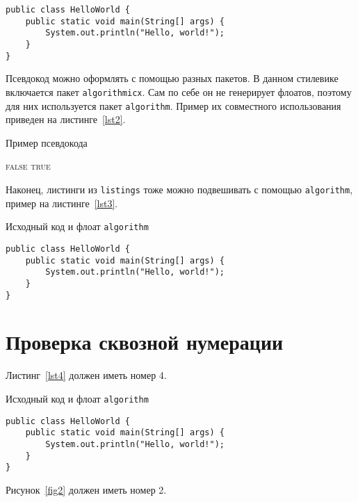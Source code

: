\documentclass[specification,annotation,times]{itmo-student-thesis}
\begin{document}
\begin{lstlisting}[float=!h,caption={Пример исходного кода на Java},label={lst1}]
public class HelloWorld {
	public static void main(String[] args) {
		System.out.println("Hello, world!");
	}
}
\end{lstlisting}

Псевдокод можно оформлять с помощью разных пакетов. В данном стилевике включается пакет \texttt{algorithmicx}.
Сам по себе он не генерирует флоатов, поэтому для них используется пакет \texttt{algorithm}.
Пример их совместного использования приведен на листинге~\ref{lst2}.

\begin{algorithm}[!h]
\caption{Пример псевдокода}\label{lst2}
\begin{algorithmic}
				\State\Return \textsc{false}
			\EndIf
		\EndFor
		\State\Return \textsc{true}
	\EndFunction
\end{algorithmic}
\end{algorithm}

Наконец, листинги из \texttt{listings} тоже можно подвешивать с помощью \texttt{algorithm},
пример на листинге~\ref{lst3}.

\begin{algorithm}[!h]
\caption{Исходный код и флоат \texttt{algorithm}}\label{lst3}
\begin{lstlisting}
public class HelloWorld {
	public static void main(String[] args) {
		System.out.println("Hello, world!");
	}
}
\end{lstlisting}
\end{algorithm}

\chapter{Проверка сквозной нумерации}

Листинг~\ref{lst4} должен иметь номер 4.

\begin{algorithm}[!h]
\caption{Исходный код и флоат \texttt{algorithm}}\label{lst4}
\begin{lstlisting}
public class HelloWorld {
	public static void main(String[] args) {
		System.out.println("Hello, world!");
	}
}
\end{lstlisting}
\end{algorithm}

Рисунок~\ref{fig2} должен иметь номер 2.
\end{document}

